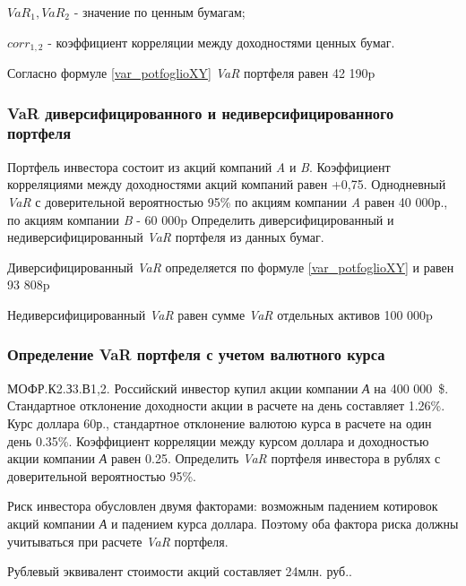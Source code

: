 \documentclass[12pt, table, a4paper,twoside]{exam}
\begin{document}
\begin{questions}
\begin{solution}[12em]
$VaR_1, VaR_2$ - значение по ценным бумагам;

$corr_{1,2}$ - коэффициент корреляции между доходностями ценных бумаг.

Согласно формуле \eqref{var_potfoglioXY} \textit{VaR} портфеля равен  42 190p
\end{solution}


\subsubsection{VaR диверсифицированного и недиверсифицированного портфеля}
\question[10] Портфель инвестора состоит из акций компаний \textit{A} и \textit{B}. Коэффициент корреляциями между доходностями акций компаний равен +0,75. Однодневный \textit{VaR }с доверительной вероятностью 95\% по акциям компании \textit{A }равен 40 000р., по акциям компании \textit{B} - 60 000p Определить диверсифицированный и недиверсифицированный \textit{VaR }портфеля из данных бумаг.

\begin{solution}[12em]

Диверсифицированный \textit{VaR} определяется по формуле \eqref{var_potfoglioXY} и равен 93 808p

Недиверсифицированный \textit{VaR} равен сумме \textit{VaR} отдельных активов 100 000p
\end{solution}

\subsubsection{Определение VaR портфеля с учетом валютного курса}
\question[10] МОФР.К2.З3.В1,2. Российский инвестор купил акции компании \textit{А} на 400 000~\$. Стандартное отклонение доходности акции в расчете на день составляет 1.26\%. Курс доллара 60р., стандартное отклонение валютою курса в расчете на один день 0.35\%. Коэффициент корреляции между курсом доллара и доходностью акции компании \textit{А} равен 0.25. Определить \textit{VaR }портфеля инвестора в рублях с доверительной вероятностью 95\%.

\begin{solution}[6em]
	
\raggedright
Риск инвестора обусловлен двумя факторами: возможным падением котировок акций компании \textit{А} и падением курса доллара. Поэтому оба фактора риска должны учитываться при расчете \textit{VaR }портфеля.

Рублевый эквивалент стоимости акций составляет 24млн. руб..


\end{solution}
\end{questions}
\end{document}
